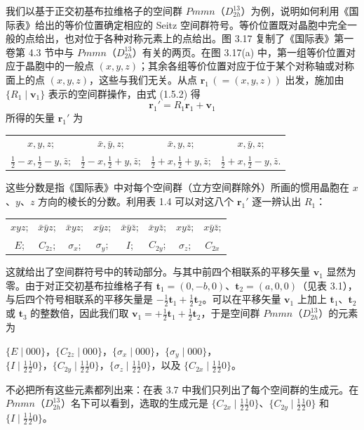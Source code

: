 我们以基于正交初基布拉维格子的空间群 $Pmmn$（$D_{2h}^{13}$）为例，说明如何利用《国际表》给出的等价位置确定相应的 Seitz 空间群符号。等价位置既对晶胞中完全一般的点给出，也对位于各种对称元素上的点给出。图 3.17 复制了《国际表》第一卷第 4.3 节中与 $Pmmn$（$D_{2h}^{13}$）有关的两页。在图 3.17(a) 中，第一组等价位置对应于晶胞中的一般点 $(x, y, z)$；其余各组等价位置对应于位于某个对称轴或对称面上的点 $(x, y, z)$，这些与我们无关。从点 $\mathbf{r}_{1}\,(=(x, y, z))$ 出发，施加由 $\{R_{1} \mid \mathbf{v}_{1}\}$ 表示的空间群操作，由式 (1.5.2) 得
\begin{equation*}
\mathbf{r}_{1}' = R_{1}\mathbf{r}_{1} + \mathbf{v}_{1}
\tag{3.5.4}
\end{equation*}
所得的矢量 $\mathbf{r}_{1}'$ 为
\begin{center}
\begin{tabular}{cccc}
$x, y, z$;\quad & $\bar{x}, \bar{y}, z$;\quad & $\bar{x}, y, z$;\quad & $x, \bar{y}, z$;\quad \\[0.5ex]
$\frac{1}{2}-x, \frac{1}{2}-y, \bar{z}$;\quad & $\frac{1}{2}-x, \frac{1}{2}+y, \bar{z}$;\quad & $\frac{1}{2}+x, \frac{1}{2}+y, \bar{z}$;\quad & $\frac{1}{2}+x, \frac{1}{2}-y, \bar{z}$.
\end{tabular}
\end{center}
这些分数是指《国际表》中对每个空间群（立方空间群除外）所画的惯用晶胞在 $x$、$y$、$z$ 方向的棱长的分数。利用表 1.4 可以对这八个 $\mathbf{r}_{1}'$ 逐一辨认出 $R_{1}$：
\begin{center}
\begin{tabular}{cccccccc}
$xyz$;\quad & $\bar{x}\bar{y}z$;\quad & $\bar{x}yz$;\quad & $x\bar{y}z$;\quad & $\bar{x}\bar{y}\bar{z}$;\quad & $\bar{x}y\bar{z}$;\quad & $xy\bar{z}$;\quad & $x\bar{y}\bar{z}$;\\
$E$;\quad & $C_{2z}$;\quad & $\sigma_{x}$;\quad & $\sigma_{y}$;\quad & $I$;\quad & $C_{2y}$;\quad & $\sigma_{z}$;\quad & $C_{2x}$
\end{tabular}
\end{center}
这就给出了空间群符号中的转动部分。与其中前四个相联系的平移矢量 $\mathbf{v}_{1}$ 显然为零。由于对正交初基布拉维格子有 $\mathbf{t}_{1} = (0, -b, 0)$、$\mathbf{t}_{2} = (a, 0, 0)$（见表 3.1），与后四个符号相联系的平移矢量是 $-\frac{1}{2}\mathbf{t}_{1} + \frac{1}{2}\mathbf{t}_{2}$。可以在平移矢量 $\mathbf{v}_{1}$ 上加上 $\mathbf{t}_{1}$、$\mathbf{t}_{2}$ 或 $\mathbf{t}_{3}$ 的整数倍，因此我们取 $\mathbf{v}_{1} = +\frac{1}{2}\mathbf{t}_{1} + \frac{1}{2}\mathbf{t}_{2}$，于是空间群 $Pmmn$（$D_{2h}^{13}$）的元素为
\begin{center}
$\{E \mid 000\}$，$\{C_{2z} \mid 000\}$，$\{\sigma_{x} \mid 000\}$，$\{\sigma_{y} \mid 000\}$，\\[0.5ex]
$\{I \mid \frac{1}{2}\frac{1}{2}0\}$，$\{C_{2y} \mid \frac{1}{2}\frac{1}{2}0\}$，$\{\sigma_{z} \mid \frac{1}{2}\frac{1}{2}0\}$，以及 $\{C_{2x} \mid \frac{1}{2}\frac{1}{2}0\}$。
\end{center}
不必把所有这些元素都列出来：在表 3.7 中我们只列出了每个空间群的生成元。在 $Pmmn$（$D_{2h}^{13}$）名下可以看到，选取的生成元是 $\{C_{2x} \mid \frac{1}{2}\frac{1}{2}0\}$、$\{C_{2y} \mid \frac{1}{2}\frac{1}{2}0\}$ 和 $\{I \mid \frac{1}{2}\frac{1}{2}0\}$。

